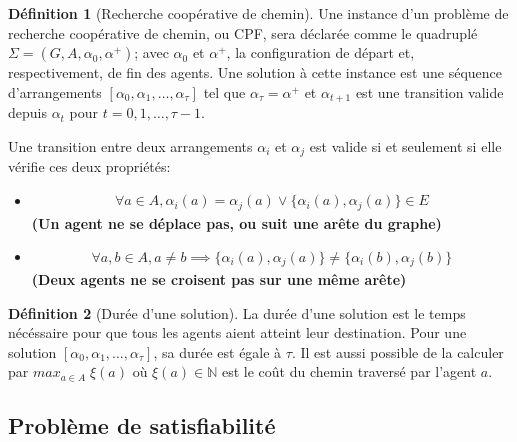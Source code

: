 \documentclass[french, 12pt, letterpaper]{article}
\theoremstyle{definition}
\newtheorem{definition}{Définition}[subsection]
\theoremstyle{proposition}
\theoremstyle{example}
\begin{document}
    \begin{definition}[Recherche coopérative de chemin]
        Une instance d'un problème de recherche coopérative de chemin, ou CPF, sera déclarée comme le quadruplé $\Sigma = ( G, A, \alpha_0, \alpha^+ )$;
        avec $\alpha_0$ et $\alpha^+$, la configuration de départ et, respectivement, de fin des agents.
        Une solution à cette instance est une séquence d'arrangements $[\alpha_0, \alpha_1, \ldots, \alpha_\tau]$ tel que $\alpha_\tau = \alpha^+$ 
        et $\alpha_{t+1}$ est une transition valide depuis $\alpha_t$ pour $t=0, 1, \ldots, \tau - 1$.
        
        Une transition entre deux arrangements $\alpha_i$ et $\alpha_j$ est valide si et seulement si elle vérifie ces deux propriétés:

        \begin{itemize}
            \item[] 
                \begin{gather}
                    \label{def:deplacement}
                    \forall a \in A, \alpha_i(a) = \alpha_j(a) \lor \{\alpha_i(a),\alpha_j(a)\} \in E
                \end{gather}
                \textbf{(Un agent ne se déplace pas, ou suit une arête du graphe)}
            \item[] 
                \begin{gather}
                    \label{def:croisement}
                    \forall a, b \in A, a \neq b \implies \{\alpha_i(a), \alpha_j(a)\} \neq \{\alpha_i(b), \alpha_j(b)\}
                \end{gather}
                \textbf{(Deux agents ne se croisent pas sur une même arête)}
        \end{itemize}
    \end{definition}

    \begin{definition}[Durée d'une solution]
        \label{sec:makespan}
        La durée d'une solution est le temps nécéssaire pour que tous les agents aient atteint leur destination. 
        Pour une solution $[\alpha_0, \alpha_1, \ldots, \alpha_\tau]$, sa durée est égale à $\tau$.
        Il est aussi possible de la calculer par $max_{a \in A}\; \xi(a)$ où $\xi(a) \in \mathbb{N}$ est le coût du chemin traversé par l'agent $a$.
    \end{definition}

    \subsection{Problème de satisfiabilité}
\end{document}
